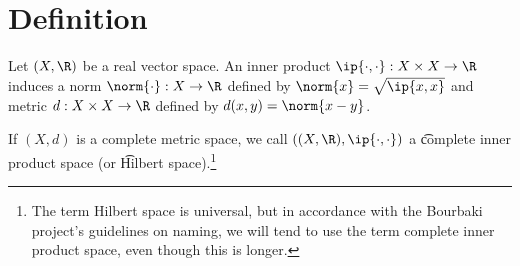 

\section*{Definition}

Let $(X, \R )$ be a real vector space. An inner product $\ip{\cdot ,\cdot }: X\times  X \to \R $ induces a norm $\norm{\cdot }: X \to \R $ defined by $\norm{x} = \sqrt{\ip{x,x}}$ and metric $d: X \times  X \to \R $ defined by $d(x, y) = \norm{x - y}$.

If $(X, d)$ is a complete metric space, we call $((X, \R ), \ip{\cdot ,\cdot })$ a \t{complete inner product space} (or \t{Hilbert space}).\footnote{The term Hilbert space is universal, but in accordance with the Bourbaki project's guidelines on naming, we will tend to use the term complete inner product space, even though this is longer.}

\blankpage